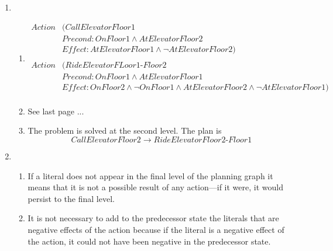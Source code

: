 \documentclass[11pt]{article}
\begin{document}
\begin{enumerate}[label=\bfseries Question \arabic*:]
\item
  \begin{enumerate}
  \item
    \begin{align*}
      Action & (CallElevatorFloor1\\
             & Precond: OnFloor1 \land AtElevatorFloor2\\
             & Effect: AtElevatorFloor1 \land \lnot AtElevatorFloor2)\\
      \\
      Action & (RideElevatorFLoor1\text{-}Floor2 \\
             & Precond: OnFloor1 \land AtElevatorFloor1\\
             & Effect: OnFloor2 \land \lnot OnFloor1 \land AtElevatorFloor2 \land \lnot AtElevatorFloor1)\\
    \end{align*}
  \item See last page ...
  \item The problem is solved at the second level.  The plan is
    \[CallElevatorFloor2 \rightarrow
    RideElevatorFloor2\text{-}Floor1\]
  \end{enumerate}
\item
  \begin{enumerate}
  \item If a literal does not appear in the final level of the
    planning graph it means that it is not a possible result of any
    action---if it were, it would persist to the final level.
  \item It is not necessary to add to the predecessor state the
    literals that are negative effects of the action because if the
    literal is a negative effect of the action, it could not have been
    negative in the predecessor state.
  \end{enumerate}
\end{enumerate}

\end{document}
